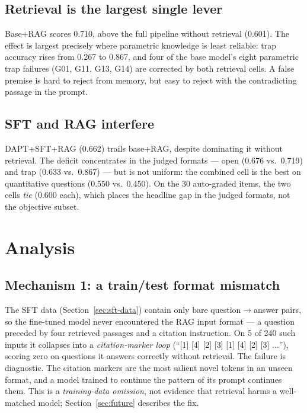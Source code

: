 \documentclass[11pt]{article}
\begin{document}
\subsection{Retrieval is the largest single lever}

Base+RAG scores 0.710, above the full pipeline without retrieval
(0.601). The effect is largest precisely where parametric knowledge is
least reliable: trap accuracy rises from 0.267 to 0.867, and four of
the base model's eight parametric trap failures (G01, G11, G13, G14)
are corrected by both retrieval cells. A false premise is hard to
reject from memory, but easy to reject with the contradicting passage
in the prompt.

\subsection{SFT and RAG interfere}

DAPT+SFT+RAG (0.662) trails base+RAG, despite dominating it without
retrieval. The deficit concentrates in the judged formats --- open
(0.676 vs.\ 0.719) and trap (0.633 vs.\ 0.867) --- but is not uniform:
the combined cell is the best on quantitative questions (0.550 vs.\
0.450). On the 30 auto-graded items, the two cells \emph{tie} (0.600
each), which places the headline gap in the judged formats, not the
objective subset.

\section{Analysis}
\label{sec:analysis}

\subsection{Mechanism 1: a train/test format mismatch}

The SFT data (Section~\ref{sec:sft-data}) contain only bare
question$\rightarrow$answer pairs, so the fine-tuned model never
encountered the RAG input format --- a question preceded by four
retrieved passages and a citation instruction. On 5 of 240 such inputs
it collapses into a \emph{citation-marker loop} (``[1] [4] [2] [3] [1]
[4] [2] [3] $\ldots$''), scoring zero on questions it answers correctly
without retrieval. The failure is diagnostic. The citation markers are
the most salient novel tokens in an unseen format, and a model trained
to continue the pattern of its prompt continues them. This is a
\emph{training-data omission}, not evidence that retrieval harms a
well-matched model; Section~\ref{sec:future} describes the fix.
\end{document}

